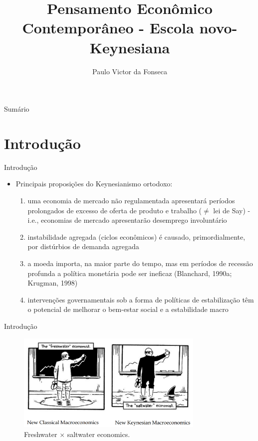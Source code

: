 \documentclass[10pt]{beamer}
\title[]{Pensamento Econômico Contemporâneo - Escola novo-Keynesiana}
\author[]{Paulo Victor da Fonseca}
\date{}
\begin{document}
\begin{frame}[plain]
\end{frame}

\begin{frame}{Sumário}
    \tableofcontents
\end{frame}

\section{Introdução}
\begin{frame}{Introdução}
    \begin{itemize}
        \item Principais proposições do Keynesianismo ortodoxo:\bigskip
        \begin{enumerate}
            \item uma economia de mercado não regulamentada apresentará períodos prolongados de excesso de oferta de produto e trabalho ($\neq$ lei de Say) - i.e., economias de mercado apresentarão desemprego involuntário \bigskip
            \item instabilidade agregada (ciclos econômicos) é causado, primordialmente, por distúrbios de demanda agregada\bigskip
            \item a moeda importa, na maior parte do tempo, mas em períodos de recessão profunda a política monetária pode ser ineficaz (Blanchard, 1990a; Krugman, 1998)\bigskip
            \item intervenções governamentais sob a forma de políticas de estabilização têm o potencial de melhorar o bem-estar social e a estabilidade macro
        \end{enumerate}
    \end{itemize}
\end{frame}

\begin{frame}{Introdução}
    \begin{figure}
        \centering
        \includegraphics[width=0.8\textwidth]{./figures/aula15_fig1.PNG}
        \caption{Freshwater $\times$ saltwater economics.}
        \label{fig1}
    \end{figure}
\end{frame}
\end{document}
